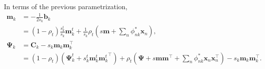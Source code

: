 \documentclass[a4paper]{article}
\begin{document}
	In terms of the previous parametrization,
	\begin{align}
		\mathbf{m}_k &= -\frac{1}{2s_k}\mathbf{b}_k \\
			&= (1 - \rho_t) \frac{s_k^t}{s_k} \mathbf{m}_k^t + \frac{1}{s_k} \rho_t \left( s\mathbf{m} + \sum_n \phi_{nk}^* \mathbf{x}_n \right), \\
		\bm{\Psi}_k
			&= \mathbf{C}_k - s_k\mathbf{m}_k\mathbf{m}_k^\top \\
			&= (1 - \rho_t) \left(\bm{\Psi}_k^t + s_k^t\mathbf{m}_k^t{\mathbf{m}_k^t}^\top\right) + \rho_t \left(\bm{\Psi} + s\mathbf{m}\mathbf{m}^\top + \sum_n \phi_{nk}^* \mathbf{x}_n\mathbf{x}_n^\top \right) - s_k\mathbf{m}_k\mathbf{m}_k^\top.
	\end{align}
\end{document}
